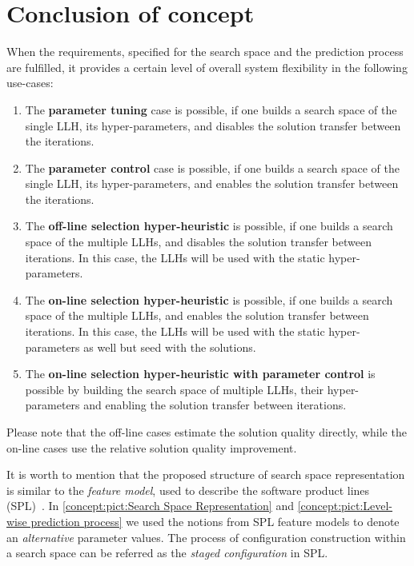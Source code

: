 \section{Conclusion of concept}\label{concept: conclution}
When the requirements, specified for the search space and the prediction process are fulfilled, it provides a certain level of overall system flexibility in the following use-cases:
\begin{enumerate}
	\item The \textbf{parameter tuning} case is possible, if one builds a search space of the single LLH, its hyper-parameters, and disables the solution transfer between the iterations.
	
	\item The \textbf{parameter control} case is possible, if one builds a search space of the single LLH, its hyper-parameters, and enables the solution transfer between the iterations. 
	
	\item The \textbf{off-line selection hyper-heuristic} is possible, if one builds a search space of the multiple LLHs, and disables the solution transfer between iterations. In this case, the LLHs will be used with the static hyper-parameters.
	
	\item The \textbf{on-line selection hyper-heuristic} is possible, if one builds a search space of the multiple LLHs, and enables the solution transfer between iterations. In this case, the LLHs will be used with the static hyper-parameters as well but seed with the solutions.
	
	\item The \textbf{on-line selection hyper-heuristic with parameter control} is possible by building the search space of multiple LLHs, their hyper-parameters and enabling the solution transfer between iterations.
\end{enumerate}

Please note that the off-line cases estimate the solution quality directly, while the on-line cases use the relative solution quality improvement.

It is worth to mention that the proposed structure of search space representation is similar to the \emph{feature model}, used to describe the software product lines (SPL)~\cite{schroeter2012multi}. In \cref{concept:pict:Search Space Representation} and \cref{concept:pict:Level-wise prediction process} we used the notions from SPL feature models to denote an \emph{alternative} parameter values. The process of configuration construction within a search space can be referred as the \emph{staged configuration} in SPL.